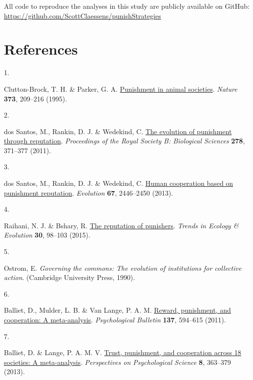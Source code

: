 \documentclass[
  man,floatsintext]{apa6}
\newlength{\cslhangindent}
\newlength{\csllabelwidth}
\newlength{\cslentryspacingunit} %
\newenvironment{CSLReferences}[2] %
 {%
  \setlength{\parindent}{0pt}
  \ifodd #1
  \let\oldpar\par
  \def\par{\hangindent=\cslhangindent\oldpar}
  \fi
  \setlength{\parskip}{#2\cslentryspacingunit}
 }%
 {}
\newcommand{\CSLLeftMargin}[1]{\parbox[t]{\csllabelwidth}{#1}}
\newcommand{\CSLRightInline}[1]{\parbox[t]{\linewidth - \csllabelwidth}{#1}\break}
\begin{document}
All code to reproduce the analyses in this study are publicly available on
GitHub: \url{https://github.com/ScottClaessens/punishStrategies}

\newpage

\hypertarget{references}{%
\section{References}\label{references}}

\begingroup

\hypertarget{refs}{}
\begin{CSLReferences}{0}{0}
\leavevmode{}%
\CSLLeftMargin{1. }%
\CSLRightInline{Clutton-Brock, T. H. \& Parker, G. A. \href{https://doi.org/10.1038/373209a0}{Punishment in animal societies}. \emph{Nature} \textbf{373}, 209--216 (1995).}

\leavevmode{}%
\CSLLeftMargin{2. }%
\CSLRightInline{dos Santos, M., Rankin, D. J. \& Wedekind, C. \href{https://doi.org/10.1098/rspb.2010.1275}{The evolution of punishment through reputation}. \emph{Proceedings of the Royal Society B: Biological Sciences} \textbf{278}, 371--377 (2011).}

\leavevmode{}%
\CSLLeftMargin{3. }%
\CSLRightInline{dos Santos, M., Rankin, D. J. \& Wedekind, C. \href{https://www.jstor.org/stable/24032701}{Human cooperation based on punishment reputation}. \emph{Evolution} \textbf{67}, 2446--2450 (2013).}

\leavevmode{}%
\CSLLeftMargin{4. }%
\CSLRightInline{Raihani, N. J. \& Bshary, R. \href{https://doi.org/10.1016/j.tree.2014.12.003}{The reputation of punishers}. \emph{Trends in Ecology \& Evolution} \textbf{30}, 98--103 (2015).}

\leavevmode{}%
\CSLLeftMargin{5. }%
\CSLRightInline{Ostrom, E. \emph{Governing the commons: The evolution of institutions for collective action}. (Cambridge University Press, 1990).}

\leavevmode{}%
\CSLLeftMargin{6. }%
\CSLRightInline{Balliet, D., Mulder, L. B. \& Van Lange, P. A. M. \href{https://doi.org/10.1037/a0023489}{Reward, punishment, and cooperation: A meta-analysis}. \emph{Psychological Bulletin} \textbf{137}, 594--615 (2011).}

\leavevmode{}%
\CSLLeftMargin{7. }%
\CSLRightInline{Balliet, D. \& Lange, P. A. M. V. \href{https://doi.org/10.1177/1745691613488533}{Trust, punishment, and cooperation across 18 societies: A meta-analysis}. \emph{Perspectives on Psychological Science} \textbf{8}, 363--379 (2013).}


\end{CSLReferences}
\end{document}
